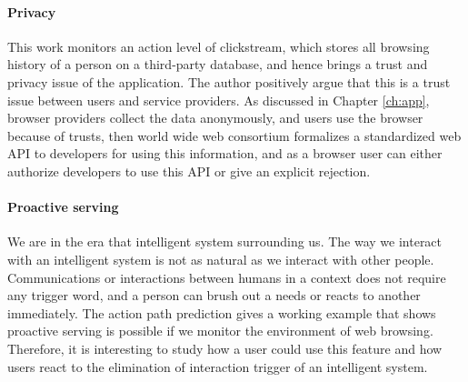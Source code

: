 \paragraph{Privacy}
This work monitors an action level of clickstream, which stores all browsing history of 
a person on a third-party database, and hence brings a trust and privacy issue of
the application. The author positively argue that this is a trust issue between users and service providers.
As discussed in Chapter \ref{ch:app}, browser providers collect the data anonymously,
and users use the browser because of trusts, then world wide web consortium formalizes
a standardized web API to developers for using this information, and as a browser user can
either authorize developers to use this API or give an explicit rejection.

\paragraph{Proactive serving} 
We are in the era that intelligent system surrounding us. The way we interact with 
an intelligent system is not as natural as we interact with other people. 
Communications or interactions between humans in a context does not require any trigger word,
and a person can brush out a needs or reacts to another immediately.
The action path prediction gives a working example that shows proactive serving is possible
if we monitor the environment of web browsing. Therefore, it is interesting to study
how a user could use this feature and how users react to the elimination of interaction trigger
of an intelligent system.

\cleardoublepage